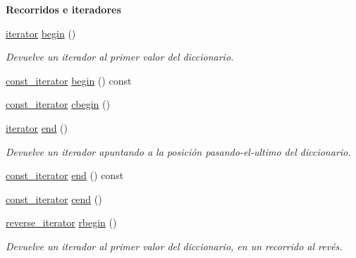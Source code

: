 \begin{Indent}\textbf{ Recorridos e iteradores}\par
\begin{DoxyCompactItemize}
\item 
\hyperlink{classaed2_1_1iterator_1_1iterator}{iterator} \hyperlink{classaed2_1_1iterator_af8901de173468531c58458b581d345a6_af8901de173468531c58458b581d345a6}{begin} ()
\begin{DoxyCompactList}\small\item\em Devuelve un iterador al primer valor del diccionario. \end{DoxyCompactList}\item 
\hyperlink{classaed2_1_1iterator_1_1const__iterator}{const\+\_\+iterator} \hyperlink{classaed2_1_1iterator_a8a5783a3ab356cd6247b98d302d9130c_a8a5783a3ab356cd6247b98d302d9130c}{begin} () const
\item 
\hyperlink{classaed2_1_1iterator_1_1const__iterator}{const\+\_\+iterator} \hyperlink{classaed2_1_1iterator_a89cca73bd2e4df39de7c412c441d6da1_a89cca73bd2e4df39de7c412c441d6da1}{cbegin} ()
\item 
\hyperlink{classaed2_1_1iterator_1_1iterator}{iterator} \hyperlink{classaed2_1_1iterator_a67caf9468be999e9be96b7add5d79946_a67caf9468be999e9be96b7add5d79946}{end} ()
\begin{DoxyCompactList}\small\item\em Devuelve un iterador apuntando a la posición pasando-\/el-\/ultimo del diccionario. \end{DoxyCompactList}\item 
\hyperlink{classaed2_1_1iterator_1_1const__iterator}{const\+\_\+iterator} \hyperlink{classaed2_1_1iterator_a66ee57cfa3bed6ffa74a1c8c23b13767_a66ee57cfa3bed6ffa74a1c8c23b13767}{end} () const
\item 
\hyperlink{classaed2_1_1iterator_1_1const__iterator}{const\+\_\+iterator} \hyperlink{classaed2_1_1iterator_a2d0d226485d9280d16a739d0b9dae525_a2d0d226485d9280d16a739d0b9dae525}{cend} ()
\item 
\hyperlink{classaed2_1_1iterator_a07b2c0fa31611e03cd019b290acd6d80_a07b2c0fa31611e03cd019b290acd6d80}{reverse\+\_\+iterator} \hyperlink{classaed2_1_1iterator_a296638725dce2fc10316d18563eb3131_a296638725dce2fc10316d18563eb3131}{rbegin} ()
\begin{DoxyCompactList}\small\item\em Devuelve un iterador al primer valor del diccionario, en un recorrido al revés. \end{DoxyCompactList}\item 

\end{DoxyCompactItemize}
\end{Indent}
